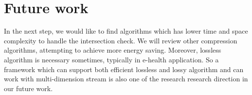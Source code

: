 % 


\section{Future work}

In the next step, we would like to find algorithms which has lower time and
space complexity to handle the intersection check. We will review other
compression algorithms, attempting to achieve more energy saving.  Moreover,
lossless algorithm is necessary sometimes, typically in e-health application. So
a framework which can support both efficient lossless and lossy algorithm and
can work with multi-dimension stream is also one of the research research
direction in our future work.
